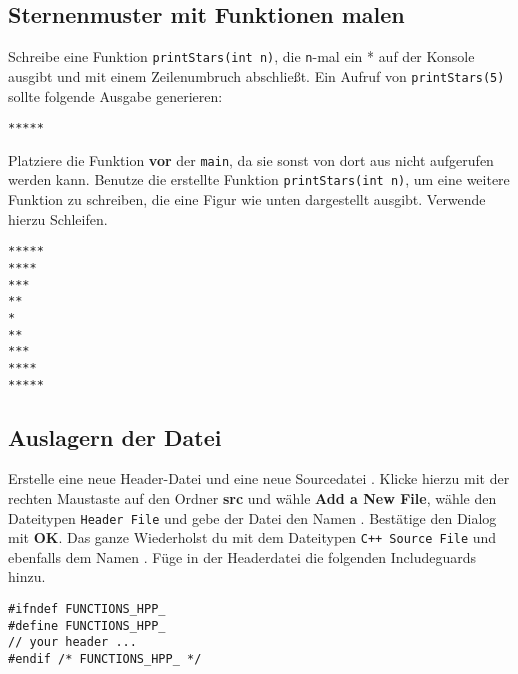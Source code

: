 \subsection{Sternenmuster mit Funktionen malen}

Schreibe eine Funktion \lstinline{printStars(int n)}, die \lstinline{n}-mal ein * auf der Konsole ausgibt und mit einem Zeilenumbruch abschließt.
Ein Aufruf von \lstinline{printStars(5)} sollte folgende Ausgabe generieren:

\begin{lstlisting}
*****
\end{lstlisting}

Platziere die Funktion \textbf{vor} der \lstinline{main}, da sie sonst von dort aus nicht aufgerufen werden kann.
Benutze die erstellte Funktion \lstinline{printStars(int n)}, um eine weitere Funktion zu schreiben, die eine Figur wie unten dargestellt ausgibt.
Verwende hierzu Schleifen.

\begin{lstlisting}
*****
****
***
**
*
**
***
****
*****
\end{lstlisting}


\subsection{Auslagern der Datei}
Erstelle eine neue Header-Datei  und eine neue
Sourcedatei .
Klicke hierzu mit der rechten Maustaste auf den Ordner \textbf{src} und wähle \textbf{Add a New File}, wähle den Dateitypen \texttt{Header File} und gebe der Datei den Namen . 
Bestätige den Dialog mit \textbf{OK}.
Das ganze Wiederholst du mit dem Dateitypen \texttt{C++ Source File} und ebenfalls dem Namen .
Füge in der Headerdatei die folgenden Includeguards hinzu.

\begin{lstlisting}
#ifndef FUNCTIONS_HPP_
#define FUNCTIONS_HPP_
// your header ...
#endif /* FUNCTIONS_HPP_ */
\end{lstlisting}

